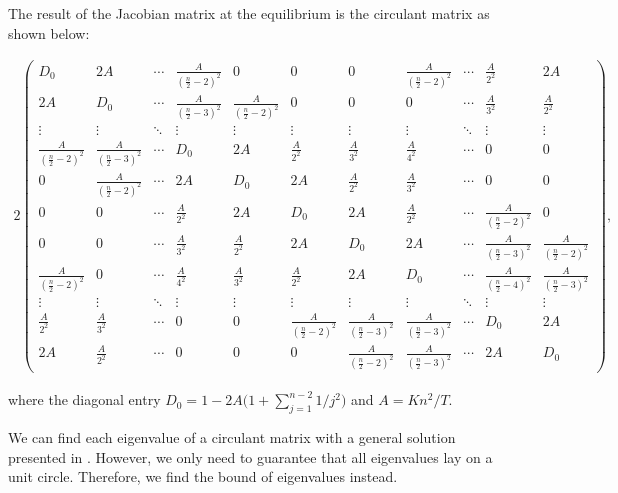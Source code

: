 The result of the Jacobian matrix at the equilibrium is the circulant matrix as shown below:

\setcounter{MaxMatrixCols}{11}
\begin{alignat}{2}
\begin{pmatrix} 
D_0 & 2A  & \cdots & \frac{A}{(\frac{n}{2}-2)^2} & 0 & 0 & 0 & \frac{A}{(\frac{n}{2}-2)^2} & \cdots  & \frac{A}{2^2} & 2A \\
2A & D_0 & \cdots & \frac{A}{(\frac{n}{2}-3)^2} & \frac{A}{(\frac{n}{2}-2)^2} & 0 & 0 & 0  & \cdots & \frac{A}{3^2} & \frac{A}{2^2} \\
\vdots & \vdots &  \ddots &  \vdots & \vdots & \vdots & \vdots & \vdots & \ddots & \vdots & \vdots \\
\frac{A}{(\frac{n}{2}-2)^2} & \frac{A}{(\frac{n}{2}-3)^2} & \cdots & D_0 & 2A & \frac{A}{2^2} & \frac{A}{3^2} & \frac{A}{4^2} & \cdots & 0 & 0  \\
0 & \frac{A}{(\frac{n}{2}-2)^2} & \cdots  & 2A & D_0 & 2A & \frac{A}{2^2} & \frac{A}{3^2} & \cdots & 0 & 0 \\
0 & 0 & \cdots  & \frac{A}{2^2} & 2A & D_0 & 2A & \frac{A}{2^2} & \cdots & \frac{A}{(\frac{n}{2}-2)^2} & 0  \\
0 & 0  & \cdots  & \frac{A}{3^2} & \frac{A}{2^2} & 2A & D_0 & 2A &  \cdots & \frac{A}{(\frac{n}{2}-3)^2} & \frac{A}{(\frac{n}{2}-2)^2}  \\
\frac{A}{(\frac{n}{2}-2)^2} & 0  & \cdots  & \frac{A}{4^2} & \frac{A}{3^2} & \frac{A}{2^2} & 2A &  D_0 &  \cdots & \frac{A}{(\frac{n}{2}-4)^2} & \frac{A}{(\frac{n}{2}-3)^2}  \\
\vdots & \vdots & \ddots &  \vdots & \vdots & \vdots &  \vdots & \vdots &  \ddots  &  \vdots & \vdots\\
\frac{A}{2^2} &  \frac{A}{3^2} &\cdots & 0 & 0 & \frac{A}{(\frac{n}{2}-2)^2} & \frac{A}{(\frac{n}{2}-3)^2} & \frac{A}{(\frac{n}{2}-3)^2} & \cdots & D_0 & 2A\\
2A & \frac{A}{2^2}  & \cdots & 0 & 0 & 0 & \frac{A}{(\frac{n}{2}-2)^2}& \frac{A}{(\frac{n}{2}-3)^2} & \cdots  & 2A & D_0
\end{pmatrix},
\end{alignat}

where the diagonal entry $D_0 = 1 - 2A\Bigg(1 + \sum_{j=1}^{n-2}1/j^2\Bigg)$ and $A=Kn^2/T$.

We can find each eigenvalue of a circulant matrix with a general solution presented in \cite{circulant}. However, we only need to guarantee that all eigenvalues lay on a unit circle. Therefore, we find the bound of eigenvalues instead.

